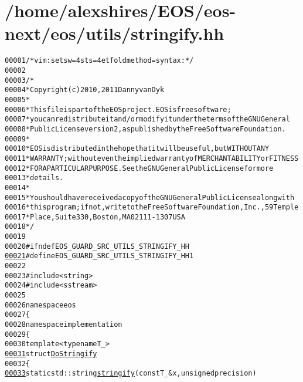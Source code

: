 \hypertarget{stringify_8hh_source}{
\section{/home/alexshires/EOS/eos-\/next/eos/utils/stringify.hh}
}


\begin{footnotesize}\begin{alltt}
00001 \textcolor{comment}{/* vim: set sw=4 sts=4 et foldmethod=syntax : */}
00002 
00003 \textcolor{comment}{/*}
00004 \textcolor{comment}{ * Copyright (c) 2010, 2011 Danny van Dyk}
00005 \textcolor{comment}{ *}
00006 \textcolor{comment}{ * This file is part of the EOS project. EOS is free software;}
00007 \textcolor{comment}{ * you can redistribute it and/or modify it under the terms of the GNU General}
00008 \textcolor{comment}{ * Public License version 2, as published by the Free Software Foundation.}
00009 \textcolor{comment}{ *}
00010 \textcolor{comment}{ * EOS is distributed in the hope that it will be useful, but WITHOUT ANY}
00011 \textcolor{comment}{ * WARRANTY; without even the implied warranty of MERCHANTABILITY or FITNESS}
00012 \textcolor{comment}{ * FOR A PARTICULAR PURPOSE.  See the GNU General Public License for more}
00013 \textcolor{comment}{ * details.}
00014 \textcolor{comment}{ *}
00015 \textcolor{comment}{ * You should have received a copy of the GNU General Public License along with}
00016 \textcolor{comment}{ * this program; if not, write to the Free Software Foundation, Inc., 59 Temple}
00017 \textcolor{comment}{ * Place, Suite 330, Boston, MA  02111-1307  USA}
00018 \textcolor{comment}{ */}
00019 
00020 \textcolor{preprocessor}{#ifndef EOS\_GUARD\_SRC\_UTILS\_STRINGIFY\_HH}
\hypertarget{stringify_8hh_source_l00021}{}\hyperlink{stringify_8hh_ac8afa13bdbf752fd2e2634f1009f187d}{00021} \textcolor{preprocessor}{}\textcolor{preprocessor}{#define EOS\_GUARD\_SRC\_UTILS\_STRINGIFY\_HH 1}
00022 \textcolor{preprocessor}{}
00023 \textcolor{preprocessor}{#include <string>}
00024 \textcolor{preprocessor}{#include <sstream>}
00025 
00026 \textcolor{keyword}{namespace }eos
00027 \{
00028     \textcolor{keyword}{namespace }implementation
00029     \{
00030         \textcolor{keyword}{template} <\textcolor{keyword}{typename} T\_>
\hypertarget{stringify_8hh_source_l00031}{}\hyperlink{structeos_1_1implementation_1_1DoStringify}{00031}         \textcolor{keyword}{struct }\hyperlink{structeos_1_1implementation_1_1DoStringify}{DoStringify}
00032         \{
\hypertarget{stringify_8hh_source_l00033}{}\hyperlink{structeos_1_1implementation_1_1DoStringify_ad66f86c95141a3322aca8f1be1030608}{00033}             \textcolor{keyword}{static} std::string \hyperlink{structeos_1_1implementation_1_1DoStringify_ad66f86c95141a3322aca8f1be1030608}{stringify}(\textcolor{keyword}{const} T\_ & x, \textcolor{keywordtype}{unsigned} precision)

\end{alltt}
\end{footnotesize}
